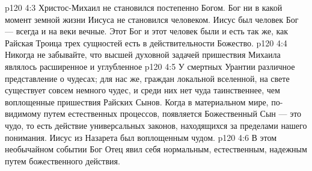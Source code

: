 \vs p120 4:3 Христос\hyp{}Михаил не становился постепенно Богом. Бог ни в какой момент земной жизни Иисуса не становился человеком. Иисус был человек  Бог --- всегда и на веки вечные. Этот Бог и этот человек были и есть  так же, как Райская Троица трех сущностей есть в действительности  Божество.
\vs p120 4:4 Никогда не забывайте, что высшей духовной задачей пришествия Михаила являлось расширенное и углубленное 
\vs p120 4:5 \pc У смертных Урантии различное представление о чудесах; для нас же, граждан локальной вселенной, на свете существует совсем немного чудес, и среди них нет чуда таинственнее, чем воплощенные пришествия Райских Сынов. Когда в материальном мире, по\hyp{}видимому путем естественных процессов, появляется Божественный Сын --- это чудо, то есть действие универсальных законов, находящихся за пределами нашего понимания. Иисус из Назарета был воплощенным чудом.
\vs p120 4:6 В этом необычайном событии Бог Отец явил себя  нормальным, естественным, надежным путем божественного действия.
